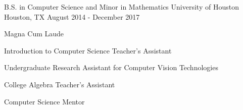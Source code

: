 

\begin{cventries}

  \cventry
    {B.S. in Computer Science and Minor in Mathematics} %
    {University of Houston} %
    {Houston, TX} %
    {August 2014 - December 2017} %
    {
      \begin{cvitems} %
        \item {Magna Cum Laude}
        \item {Introduction to Computer Science Teacher's Assistant}
        \item {Undergraduate Research Assistant for Computer Vision Technologies}
        \item {College Algebra Teacher's Assistant}
        \item {Computer Science Mentor}
      \end{cvitems}
    }

\end{cventries}
